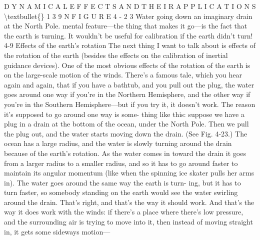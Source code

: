 \documentclass[10pt,oneside]{article}
\begin{document}
D Y N A M I C A L  E F F E C T S  A N D  T H E I R  A P P L I C A T I O N S \textbackslash{}textbullet\{\} 1 3 9 N F I G U R E  4 - 2 3 Water going down an imaginary drain at the North Pole. mental feature---the thing that makes it go---is the fact that the earth is turning. It wouldn’t be useful for calibration if the earth didn’t turn! 4-9 Effects of the earth’s rotation The next thing I want to talk about is effects of the rotation of the earth (besides the effects on the calibration of inertial guidance devices). One of the most obvious effects of the rotation of the earth is on the large-scale motion of the winds. There’s a famous tale, which you hear again and again, that if you have a bathtub, and you pull out the plug, the water goes around one way if you’re in the Northern Hemisphere, and the other way if you’re in the Southern Hemisphere---but if you try it, it doesn’t work. The reason it’s supposed to go around one way is some- thing like this: suppose we have a plug in a drain at the bottom of the ocean, under the North Pole. Then we pull the plug out, and the water starts moving down the drain. (See Fig. 4-23.) The ocean has a large radius, and the water is slowly turning around the drain because of the earth’s rotation. As the water comes in toward the drain it goes from a larger radius to a smaller radius, and so it has to go around faster to maintain its angular momentum (like when the spinning ice skater pulls her arms in). The water goes around the same way the earth is turn- ing, but it has to turn faster, so somebody standing on the earth would see the water swirling around the drain. That’s right, and that’s the way it should work. And that’s the way it does work with the winds: if there’s a place where there’s low pressure, and the surrounding air is trying to move into it, then instead of moving straight in, it gets some sideways motion---\par
\end{document}
